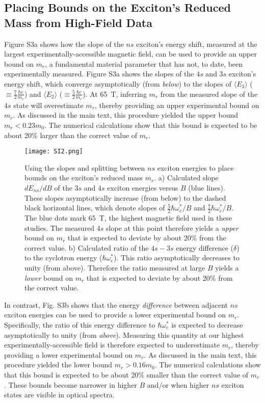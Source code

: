 \documentclass[aps,prl,twocolumn]{revtex4-1}
\begin{document}
\subsection{Placing Bounds on the Exciton's Reduced Mass from High-Field Data}
Figure S3a shows how the slope of the $ns$ exciton's energy shift, measured at the largest experimentally-accessible magnetic field, can be used to provide an upper bound on $m_r$, a fundamental material parameter that has not, to date, been experimentally measured. Figure S3a shows the slopes of the $4s$ and $3s$ exciton's energy shift, which converge asymptotically (from \textit{below}) to the slopes of $\langle E_3 \rangle$ ($\equiv \frac{7}{2} \frac{\hbar e}{m_r}$) and $\langle E_2 \rangle$ ($\equiv \frac{5}{2} \frac{\hbar e}{m_r}$). At 65~T, inferring $m_r$ from the measured slope of the $4s$ state will overestimate $m_r$, thereby providing an upper experimental bound on $m_r$. As discussed in the main text, this procedure yielded the upper bound $m_r < 0.23 m_0$. The numerical calculations show that this bound is expected to be about 20\% larger than the correct value of $m_r$. 
%
\begin{figure*}[h]
\center
\texttt{[image: SI2.png]}
\caption{Using the slopes and splitting between $ns$ exciton energies to place bounds on the exciton's reduced mass $m_r$. a) Calculated slope $dE_{ns}/dB$ of the $3s$ and $4s$ exciton energies versus $B$ (blue lines). These slopes asymptotically increase (from below) to the dashed black horizontal lines, which denote slopes of $\frac{5}{2}\hbar \omega_c^* / B$ and $\frac{7}{2}\hbar \omega_c^* /B$. The blue dots mark 65~T, the highest magnetic field used in these studies. The measured $4s$ slope at this point therefore yields a \textit{upper} bound on $m_r$ that is expected to deviate by about 20\% from the correct value. b) Calculated ratio of the $4s-3s$ energy difference ($\delta$) to the cyclotron energy ($\hbar \omega_c^*$). This ratio asymptotically decreases  to unity (from above).  Therefore the ratio measured at large $B$ yields a \textit{lower} bound on $m_r$ that is expected to deviate by about 20\% from the correct value.}  \label{fig1}
\end{figure*}

In contrast, Fig. S3b shows that the energy \textit{difference} between adjacent $ns$ exciton energies can be used to provide a lower experimental bound on $m_r$. Specifically, the ratio of this energy difference to $\hbar \omega_c^*$ is expected to decrease asymptotically to unity (from \textit{above}). Measuring this quantity at our highest experimentally-accessible field is therefore expected to underestimate $m_r$, thereby providing a lower experimental bound on $m_r$.  As discussed in the main text, this procedure yielded the lower bound $m_r > 0.16 m_0$.  The numerical calculations show that this bound is expected to be about 20\% smaller than the correct value of $m_r$. These bounds become narrower in higher $B$ and/or when higher $ns$ exciton states are visible in optical spectra.
\end{document}
